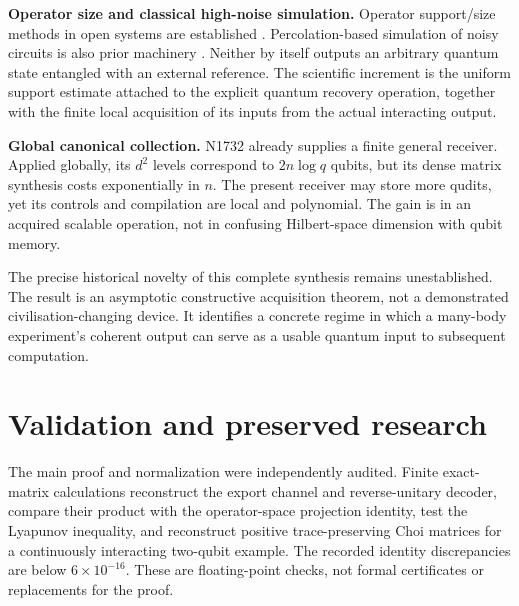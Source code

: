 \documentclass[11pt,a4paper]{article}
\begin{document}
\textbf{Operator size and classical high-noise simulation.} Operator support/size methods in open systems are established \cite{schuster2023}. Percolation-based simulation of noisy circuits is also prior machinery \cite{aharonov1996}. Neither by itself outputs an arbitrary quantum state entangled with an external reference. The scientific increment is the uniform support estimate attached to the explicit quantum recovery operation, together with the finite local acquisition of its inputs from the actual interacting output.

\textbf{Global canonical collection.} N1732 already supplies a finite general receiver. Applied globally, its $d^2$ levels correspond to $2n\log q$ qubits, but its dense matrix synthesis costs exponentially in $n$. The present receiver may store more qudits, yet its controls and compilation are local and polynomial. The gain is in an acquired scalable operation, not in confusing Hilbert-space dimension with qubit memory.

The precise historical novelty of this complete synthesis remains unestablished. The result is an asymptotic constructive acquisition theorem, not a demonstrated civilisation-changing device. It identifies a concrete regime in which a many-body experiment's coherent output can serve as a usable quantum input to subsequent computation.

\section{Validation and preserved research}

The main proof and normalization were independently audited. Finite exact-matrix calculations reconstruct the export channel and reverse-unitary decoder, compare their product with the operator-space projection identity, test the Lyapunov inequality, and reconstruct positive trace-preserving Choi matrices for a continuously interacting two-qubit example. The recorded identity discrepancies are below $6\times10^{-16}$. These are floating-point checks, not formal certificates or replacements for the proof.
\end{document}
